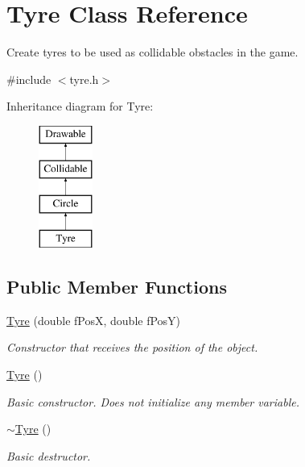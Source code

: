 \hypertarget{class_tyre}{}\section{Tyre Class Reference}
\label{class_tyre}


Create tyres to be used as collidable obstacles in the game.  




{\ttfamily \#include $<$tyre.\+h$>$}

Inheritance diagram for Tyre\+:\begin{figure}[H]
\begin{center}
\leavevmode
\includegraphics[height=4.000000cm]{class_tyre}
\end{center}
\end{figure}
\subsection*{Public Member Functions}
\begin{DoxyCompactItemize}
\item 
\hyperlink{class_tyre_aa8316602e846dd79412579a2c3ad92c7}{Tyre} (double f\+Pos\+X, double f\+Pos\+Y)
\begin{DoxyCompactList}\small\item\em Constructor that receives the position of the object. \end{DoxyCompactList}\item 
\hypertarget{class_tyre_a162dbaad7ae74443df530dfb147fb694}{}\hyperlink{class_tyre_a162dbaad7ae74443df530dfb147fb694}{Tyre} ()\label{class_tyre_a162dbaad7ae74443df530dfb147fb694}

\begin{DoxyCompactList}\small\item\em Basic constructor. Does not initialize any member variable. \end{DoxyCompactList}\item 
\hypertarget{class_tyre_a3ace196877f68acd82b89e8cd33825ec}{}\hyperlink{class_tyre_a3ace196877f68acd82b89e8cd33825ec}{$\sim$\+Tyre} ()\label{class_tyre_a3ace196877f68acd82b89e8cd33825ec}

\begin{DoxyCompactList}\small\item\em Basic destructor. \end{DoxyCompactList}\end{DoxyCompactItemize}
